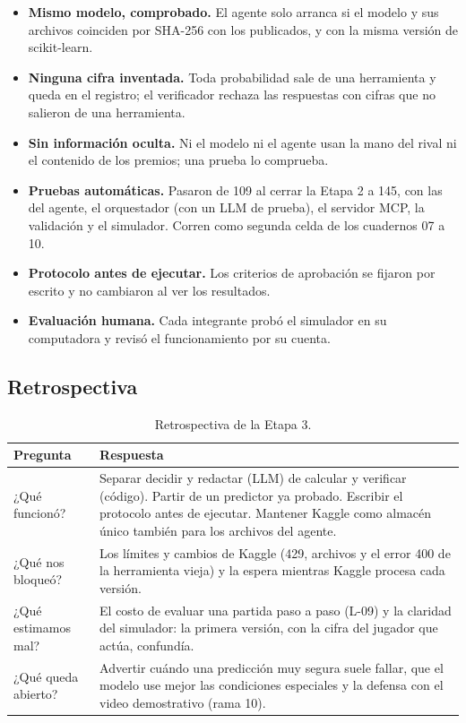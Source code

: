 \begin{itemize}
  \item \textbf{Mismo modelo, comprobado.} El agente solo arranca si el modelo
        y sus archivos coinciden por SHA-256 con los publicados, y con la
        misma versi\'on de scikit-learn.
  \item \textbf{Ninguna cifra inventada.} Toda probabilidad sale de una
        herramienta y queda en el registro; el verificador rechaza las
        respuestas con cifras que no salieron de una herramienta.
  \item \textbf{Sin informaci\'on oculta.} Ni el modelo ni el agente usan la
        mano del rival ni el contenido de los premios; una prueba lo comprueba.
  \item \textbf{Pruebas autom\'aticas.} Pasaron de 109 al cerrar la Etapa 2 a
        145, con las del agente, el orquestador (con un LLM de prueba), el
        servidor MCP, la validaci\'on y el simulador. Corren como segunda
        celda de los cuadernos 07 a 10.
  \item \textbf{Protocolo antes de ejecutar.} Los criterios de aprobaci\'on se
        fijaron por escrito y no cambiaron al ver los resultados.
  \item \textbf{Evaluaci\'on humana.} Cada integrante prob\'o el simulador en su
        computadora y revis\'o el funcionamiento por su cuenta.
\end{itemize}

\subsection{Retrospectiva}

\begin{table}[H]
  \centering
  \caption{Retrospectiva de la Etapa 3.}
  \label{tab:stage3retro}
  \footnotesize
  \begin{tabularx}{\textwidth}{@{}P{4.0cm} Y@{}}
    \toprule
    \textbf{Pregunta} & \textbf{Respuesta}\\
    \midrule
    ¿Qu\'e funcion\'o? & Separar decidir y redactar (LLM) de calcular y verificar (c\'odigo). Partir de un predictor ya probado. Escribir el protocolo antes de ejecutar. Mantener Kaggle como almac\'en \'unico tambi\'en para los archivos del agente.\\
    ¿Qu\'e nos bloque\'o? & Los l\'imites y cambios de Kaggle (429, archivos  y el error 400 de la herramienta vieja) y la espera mientras Kaggle procesa cada versi\'on.\\
    ¿Qu\'e estimamos mal? & El costo de evaluar una partida paso a paso (L-09) y la claridad del simulador: la primera versi\'on, con la cifra del jugador que act\'ua, confund\'ia.\\
    ¿Qu\'e queda abierto? & Advertir cu\'ando una predicci\'on muy segura suele fallar, que el modelo use mejor las condiciones especiales y la defensa con el video demostrativo (rama 10).\\
    \bottomrule
  \end{tabularx}
\end{table}

